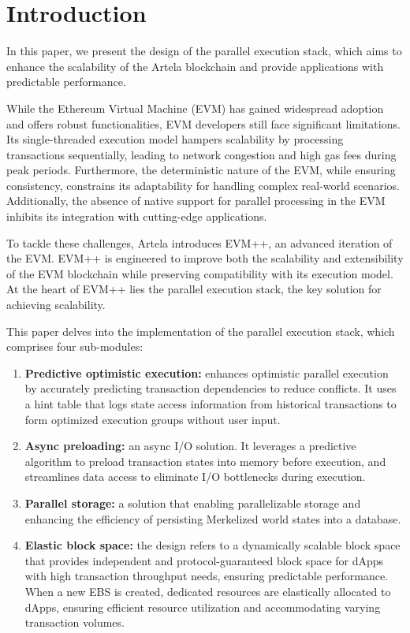 
\section{Introduction}

In this paper, we present the design of the parallel execution stack, which aims to enhance the scalability of the Artela blockchain \cite{artela2023} and provide applications with predictable performance.

While the Ethereum Virtual Machine (EVM)\cite{ethereum2020evm} has gained widespread adoption and offers robust functionalities, EVM developers still face significant limitations. Its single-threaded execution model hampers scalability by processing transactions sequentially, leading to network congestion and high gas fees during peak periods. Furthermore, the deterministic nature of the EVM, while ensuring consistency, constrains its adaptability for handling complex real-world scenarios. Additionally, the absence of native support for parallel processing in the EVM inhibits its integration with cutting-edge applications.

To tackle these challenges, Artela introduces EVM++\cite{artela_evm_plus_plus}, an advanced iteration of the EVM. EVM++ is engineered to improve both the scalability and extensibility of the EVM blockchain while preserving compatibility with its execution model. At the heart of EVM++ lies the parallel execution stack, the key solution for achieving scalability.

This paper delves into the implementation of the parallel execution stack, which comprises four sub-modules:

\begin{enumerate}
  \item \textbf{Predictive optimistic execution:} enhances optimistic parallel execution by accurately predicting transaction dependencies to reduce conflicts. It uses a hint table that logs state access information from historical transactions to form optimized execution groups without user input.
  \item \textbf{Async preloading:} an async I/O solution. It leverages a predictive algorithm to preload transaction states into memory before execution, and streamlines data access to eliminate I/O bottlenecks during execution.
  \item \textbf{Parallel storage:} a solution that enabling parallelizable storage and enhancing the efficiency of persisting Merkelized world states into a database.
  \item \textbf{Elastic block space:} the design refers to a dynamically scalable block space that provides independent and protocol-guaranteed block space for dApps with high transaction throughput needs, ensuring predictable performance. When a new EBS is created, dedicated resources are elastically allocated to dApps, ensuring efficient resource utilization and accommodating varying transaction volumes.
\end{enumerate}
